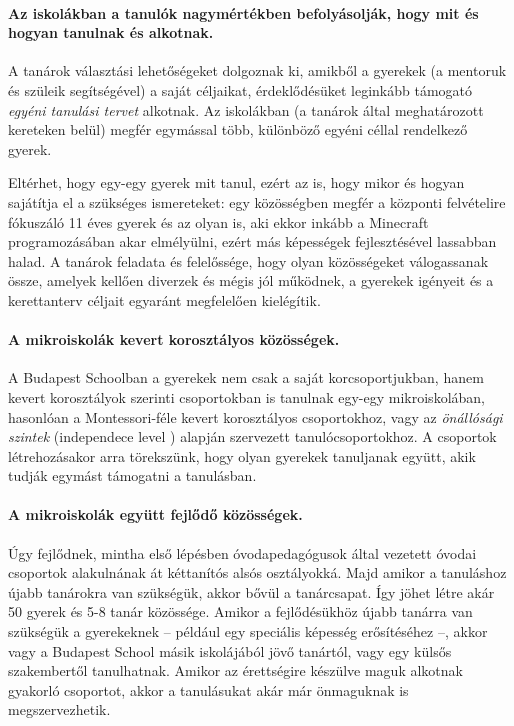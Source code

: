  \paragraph{Az iskolákban a tanulók nagymértékben befolyásolják, hogy mit és hogyan tanulnak és alkotnak.}

    A tanárok választási lehetőségeket dolgoznak ki, amikből a gyerekek (a
    mentoruk és szüleik segítségével) a saját céljaikat, érdeklődésüket leginkább
    támogató \emph{egyéni tanulási tervet} alkotnak. Az iskolákban (a tanárok által
    meghatározott kereteken belül) megfér egymással több, különböző egyéni céllal
    rendelkező gyerek.

    Eltérhet, hogy egy-egy gyerek mit tanul, ezért az is, hogy mikor és hogyan
    sajátítja el a szükséges ismereteket: egy közösségben megfér a központi
    felvételire fókuszáló 11 éves gyerek és az olyan is, aki ekkor inkább a
    Mine\-craft programozásában akar elmélyülni, ezért más képességek fejlesztésével
    lassabban halad. A tanárok feladata és felelőssége, hogy olyan közösségeket
    válogassanak össze, amelyek kellően diverzek és mégis jól működnek, a gyerekek
    igényeit és a kerettanterv céljait egyaránt megfelelően kielégítik.

  \paragraph{A mikroiskolák kevert korosztályos közösségek.}

    A Budapest Schoolban a gyerekek nem csak a saját korcsoportjukban, hanem kevert korosztályok szerinti csoportokban is tanulnak egy-egy mikroiskolában, hasonlóan a Montessori-féle kevert korosztályos csoportokhoz, vagy az \emph{önállósági szintek} (independece level \citep{indepence_level}) alapján szervezett tanulócsoportokhoz. A csoportok létrehozásakor arra törekszünk, hogy olyan gyerekek tanuljanak együtt, akik tudják egymást támogatni a tanulásban.

  \paragraph{A mikroiskolák együtt fejlődő közösségek.}

    Úgy fejlődnek, mintha első lépésben óvodapedagógusok által vezetett óvodai csoportok
    alakulnának át kéttanítós alsós osztályokká. Majd amikor a tanuláshoz újabb
    tanárokra van szükségük, akkor bővül a tanárcsapat. Így jöhet létre akár 50 gyerek és 5-8
    tanár közössége. Amikor a fejlődésükhöz újabb tanárra van szükségük a
    gyerekeknek -- például egy speciális képesség erősítéséhez --, akkor vagy a
    Budapest School másik iskolájából jövő tanártól, vagy egy külsős szakembertől
    tanulhatnak. Amikor az érettségire készülve maguk alkotnak gyakorló csoportot, akkor a tanulásukat akár már önmaguknak is megszervezhetik.

